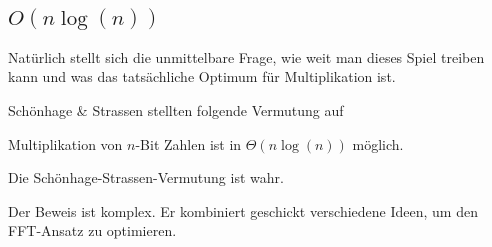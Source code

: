 
\subsection{$O(n\log(n))$}

\begin{remark}
    Natürlich stellt sich die unmittelbare Frage, wie weit man dieses Spiel treiben kann und was das tatsächliche Optimum für Multiplikation ist.

    Schönhage \& Strassen stellten folgende Vermutung auf
\end{remark}

\begin{conjecture}
    Multiplikation von $n$-Bit Zahlen ist in $\Theta(n\log(n))$ möglich.
\end{conjecture}

\begin{theorem}
    Die Schönhage-Strassen-Vermutung ist wahr.
\end{theorem}

\begin{remark}
    Der Beweis ist komplex. Er kombiniert geschickt verschiedene Ideen, um den FFT-Ansatz zu optimieren.
\end{remark}

